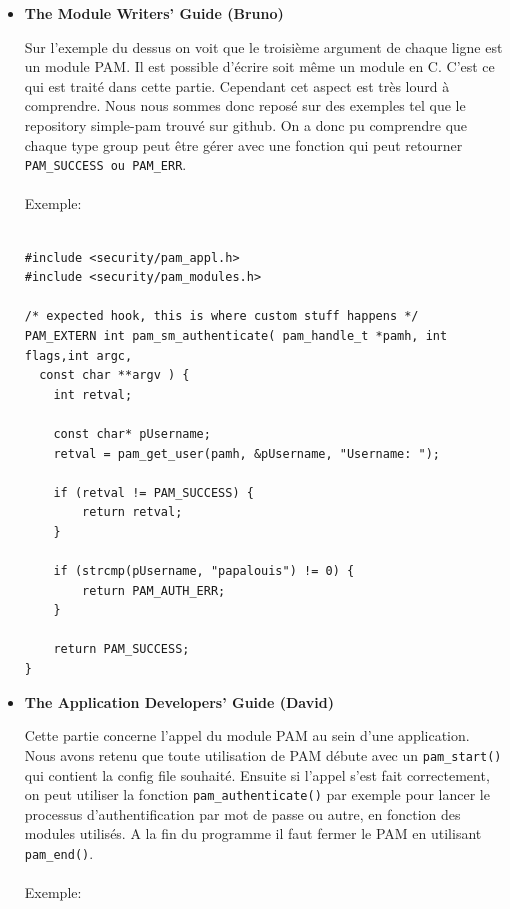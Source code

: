 \documentclass[french]{report}
\begin{document}
\begin{itemize}[label=\textbullet, font=\normalfont \color{blue}]
\vspace{0.5cm}

    \item{\textbf{The Module Writers' Guide (Bruno)}}

    \vspace{0.05cm}

Sur l’exemple du dessus on voit que le troisième argument de chaque ligne est
un module PAM. Il est possible d’écrire soit même un module en C. C’est ce qui
est traité dans cette partie. Cependant cet aspect est très lourd à comprendre.
Nous nous sommes donc reposé sur des exemples tel que le repository simple-pam
trouvé sur github. On a donc pu comprendre que chaque type group peut être
gérer avec une fonction qui peut retourner \texttt{PAM\_SUCCESS ou PAM\_ERR}.
\\ \\
    Exemple:

  \begin{verbatim}

#include <security/pam_appl.h>
#include <security/pam_modules.h>

/* expected hook, this is where custom stuff happens */
PAM_EXTERN int pam_sm_authenticate( pam_handle_t *pamh, int flags,int argc,
  const char **argv ) {
	int retval;

	const char* pUsername;
	retval = pam_get_user(pamh, &pUsername, "Username: ");

	if (retval != PAM_SUCCESS) {
		return retval;
	}

	if (strcmp(pUsername, "papalouis") != 0) {
		return PAM_AUTH_ERR;
	}

	return PAM_SUCCESS;
}
\end{verbatim}

\vspace{0.5cm}

    \item{\textbf{The Application Developers' Guide (David)}}

    \vspace{0.05cm}

  Cette partie concerne l’appel du module PAM au sein d’une application. Nous
  avons retenu que toute utilisation de PAM débute avec un \texttt{pam\_start()}
  qui contient la config file souhaité. Ensuite si l’appel s’est fait
  correctement, on peut utiliser la fonction \texttt{pam\_authenticate()} par
  exemple pour lancer le processus d’authentification par mot de passe ou
  autre, en fonction des modules utilisés. A la fin du programme il faut fermer
  le PAM en utilisant \texttt{pam\_end()}.
\\ \\
    Exemple:


\end{itemize}
\end{document}
